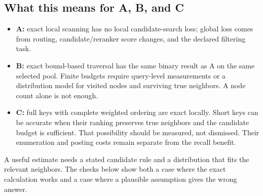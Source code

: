 \subsection{What this means for A, B, and C}
\begin{itemize}
\item \textbf{A:} exact local scanning has no local candidate-search loss; global loss comes
from routing, candidate/reranker score changes, and the declared filtering task.
\item \textbf{B:} exact bound-based traversal has the same binary result as A on the same
selected pool. Finite budgets require query-level measurements or a distribution model for
visited nodes and surviving true neighbors. A node count alone is not enough.
\item \textbf{C:} full keys with complete weighted ordering are exact locally. Short keys can
be accurate when their ranking preserves true neighbors and the candidate budget is sufficient.
That possibility should be measured, not dismissed. Their enumeration and posting costs remain
separate from the recall benefit.
\end{itemize}
A useful estimate needs a stated candidate rule and a distribution that fits the relevant
neighbors. The checks below show both a case where the exact calculation works and a case
where a plausible assumption gives the wrong answer.
